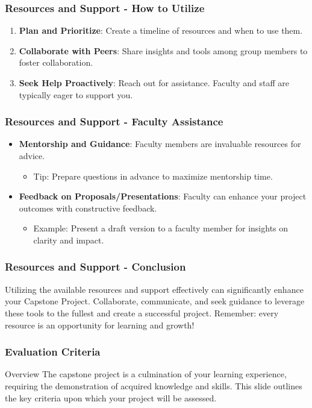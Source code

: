 \documentclass[aspectratio=169]{beamer}
\begin{document}
\begin{frame}[fragile]
    \frametitle{Resources and Support - How to Utilize}
    \begin{enumerate}
        \item \textbf{Plan and Prioritize}: Create a timeline of resources and when to use them.
        \item \textbf{Collaborate with Peers}: Share insights and tools among group members to foster collaboration.
        \item \textbf{Seek Help Proactively}: Reach out for assistance. Faculty and staff are typically eager to support you.
    \end{enumerate}
\end{frame}

\begin{frame}[fragile]
    \frametitle{Resources and Support - Faculty Assistance}
    \begin{itemize}
        \item \textbf{Mentorship and Guidance}: Faculty members are invaluable resources for advice.
        \begin{itemize}
            \item Tip: Prepare questions in advance to maximize mentorship time.
        \end{itemize}
        \item \textbf{Feedback on Proposals/Presentations}: Faculty can enhance your project outcomes with constructive feedback.
        \begin{itemize}
            \item Example: Present a draft version to a faculty member for insights on clarity and impact.
        \end{itemize}
    \end{itemize}
\end{frame}

\begin{frame}[fragile]
    \frametitle{Resources and Support - Conclusion}
    Utilizing the available resources and support effectively can significantly enhance your Capstone Project. Collaborate, communicate, and seek guidance to leverage these tools to the fullest and create a successful project. Remember: every resource is an opportunity for learning and growth!
\end{frame}

\begin{frame}[fragile]
    \frametitle{Evaluation Criteria}
    \begin{block}{Overview}
        The capstone project is a culmination of your learning experience, requiring the demonstration of acquired knowledge and skills. This slide outlines the key criteria upon which your project will be assessed.
    \end{block}
\end{frame}
\end{document}
